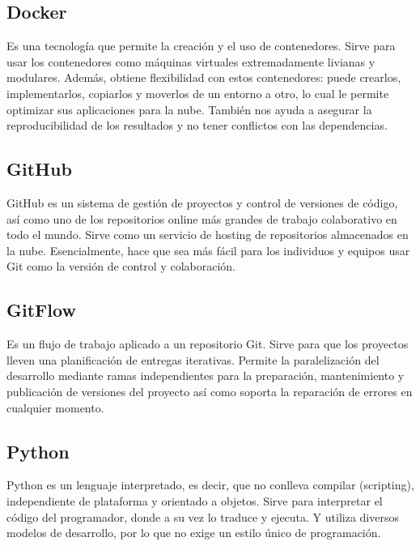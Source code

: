 \documentclass[12pt,letterpaper]{article}
\begin{document}
\subsection*{Docker}
Es una tecnología que permite la creación y el uso de contenedores.
Sirve para usar los contenedores como máquinas virtuales extremadamente livianas y modulares.
Además, obtiene flexibilidad con estos contenedores: puede crearlos, implementarlos, copiarlos y
moverlos de un entorno a otro, lo cual le permite optimizar sus aplicaciones para la nube.
\citep{redhat_docker}
También nos ayuda a asegurar la reproducibilidad de los resultados y no tener conflictos con las
dependencias.

\subsection*{GitHub}
GitHub es un sistema de gestión de proyectos y control de versiones de código, así como uno de los
repositorios online más grandes de trabajo colaborativo en todo el mundo.
\citep{hostinger_tutoriales_2019}
Sirve como un servicio de hosting de repositorios almacenados en la nube.  Esencialmente, hace que
sea más fácil para los individuos y equipos usar Git como la versión de control y colaboración.
\citep{kinsta_2020}

\subsection*{GitFlow}
Es un flujo de trabajo aplicado a un repositorio Git. Sirve para que los proyectos lleven una
planificación de entregas iterativas. Permite la paralelización del desarrollo mediante ramas
independientes para la preparación, mantenimiento y publicación de versiones del proyecto así como
soporta la reparación de errores en cualquier momento.
\citep{claventy_2020}

\subsection*{Python}
Python es un lenguaje interpretado, es decir, que no conlleva compilar (scripting), independiente de
plataforma y orientado a objetos. 
\citep{desarrollo_web_2003}
Sirve para interpretar el código del programador, donde a su vez lo traduce y ejecuta. Y utiliza
diversos modelos de desarrollo, por lo que no exige un estilo único de programación.
\citep{angeles_2020}
\end{document}
